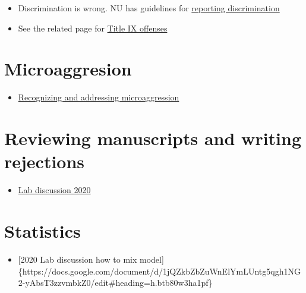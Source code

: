 \documentclass[
  letterpaper,
  DIV=11,
  numbers=noendperiod]{scrreprt}
\providecommand{\tightlist}{%
  \setlength{\itemsep}{0pt}\setlength{\parskip}{0pt}}\usepackage{longtable,booktabs,array}
\begin{document}
\begin{itemize}
\item
  Discrimination is wrong. NU has guidelines for
  \href{https://www.northeastern.edu/ouec/reporting-options/discrimination/}{reporting
  discrimination}
\item
  See the related page for
  \href{https://www.northeastern.edu/ouec/reporting-options/titleix-prohibited-offenses/}{Title
  IX offenses}
\end{itemize}

\hypertarget{microaggresion}{%
\section*{\texorpdfstring{\textbf{Microaggresion}}{Microaggresion}}\label{microaggresion}}

\begin{itemize}
\tightlist
\item
  \href{https://github.com/DrK-Lo/lotterhoslabprotocols/blob/gh-pages/Recognizing\%20and\%20Addressing\%20Microaggressions\%20Takewaways\%202021.pdf}{Recognizing
  and addressing microaggression}
\end{itemize}

\hypertarget{reviewing-manuscripts-and-writing-rejections}{%
\section*{\texorpdfstring{\textbf{Reviewing manuscripts and writing
rejections}}{Reviewing manuscripts and writing rejections}}\label{reviewing-manuscripts-and-writing-rejections}}

\begin{itemize}
\tightlist
\item
  \href{https://docs.google.com/document/d/1BGYn66Q0mkXOwL5S_woHOLh7__dTHQzQDxRc5EnKLNw/edit\#}{Lab
  discussion 2020}
\end{itemize}

\hypertarget{statistics}{%
\section*{\texorpdfstring{\textbf{Statistics}}{Statistics}}\label{statistics}}

\begin{itemize}
\tightlist
\item
  {[}2020 Lab discussion how to mix
  model{]}\{https://docs.google.com/document/d/1jQZkbZbZuWnElYmLUntg5qgh1NG2-yAbsT3zzvmbkZ0/edit\#heading=h.btb80w3ha1pf\}
\end{itemize}
\end{document}
